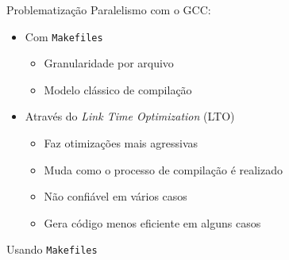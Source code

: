 \begin{frame}{Problematização}
    Paralelismo com o GCC:
    \begin{itemize}
        \item Com \texttt{Makefiles}
            \begin{itemize}
                \item Granularidade por arquivo
                \item Modelo clássico de compilação
            \end{itemize}
        \item Através do \textit{Link Time Optimization} (LTO)
            \begin{itemize}
                \item Faz otimizações mais agressivas
                \item Muda como o processo de compilação é realizado
                \item Não confiável em vários casos
                \item Gera código menos eficiente em alguns casos
            \end{itemize}
    \end{itemize}
\end{frame}


\begin{frame}[standout]
    Usando \texttt{Makefiles}
\end{frame}


